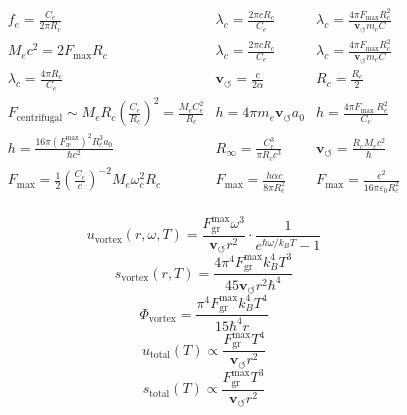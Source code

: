     \begin{equation*}
    \begin{array}{ccc}
            f_e = \frac{C_e}{2 \pi R_c} & \lambda_c = \frac{2 \pi c R_c}{C_e} & \lambda_c = \frac{4 \pi F_{\max } R_c^2}{\mathbf{v}_{\scriptscriptstyle\boldsymbol{\circlearrowleft}} m_e C} \\
            M_e c^2 = 2 F_{\max } R_c & \lambda_c = \frac{2 \pi c R_c}{C_e} & \lambda_c = \frac{4 \pi F_{\max } R_c^2}{\mathbf{v}_{\scriptscriptstyle\boldsymbol{\circlearrowleft}} m_e C} \\
            \lambda_c = \frac{4 \pi R_c}{C_e} & \mathbf{v}_{\scriptscriptstyle\boldsymbol{\circlearrowleft}} = \frac{c}{2 \alpha} & R_c = \frac{R_e}{2} \\
            F_\text{centrifugal} \sim M_e R_c \left(\frac{C_e}{R_c}\right)^2 = \frac{M_e C_e^2}{R_c} & h = 4 \pi m_e \mathbf{v}_{\scriptscriptstyle\boldsymbol{\circlearrowleft}} a_0 & h = \frac{4 \pi F_\text {max } R_e^2}{C_e} \\
            h = \frac{16 \pi (F^{\text{max}}_{\text{\ae}})^2 R_c^3 a_0}{\hbar c^2} & R_\infty = \frac{C_e^3}{\pi R_c c^3} & \mathbf{v}_{\scriptscriptstyle\boldsymbol{\circlearrowleft}} = \frac{R_c M_e c^2}{\hbar} \\
            F_{\max} = \frac{1}{2} \left( \frac{C_e}{c} \right)^{-2} M_e \omega_c^2 R_c & F_{\max} = \frac{h \alpha c}{8 \pi R_c^2} & F_{\max} = \frac{e^2}{16 \pi \varepsilon_0 R_c^2} \\
    \end{array}
    \end{equation*}


\begin{equation*}
    u_\text{vortex}(r, \omega, T) = \frac{F^{\text{max}}_{\text{gr}} \omega^3}{\mathbf{v}_{\scriptscriptstyle\boldsymbol{\circlearrowleft}} r^2} \cdot \frac{1}{e^{\hbar \omega / k_B T} - 1}
\end{equation*}
\begin{equation*}
    s_\text{vortex}(r, T) = \frac{4 \pi^4 F^{\text{max}}_{\text{gr}} k_B^4 T^3}{45 \mathbf{v}_{\scriptscriptstyle\boldsymbol{\circlearrowleft}} r^2 \hbar^4}
\end{equation*}
\begin{equation*}
    \Phi_\text{vortex} = \frac{\pi^4 F^{\text{max}}_{\text{gr}} k_B^4 T^4}{15 \hbar^4 r}
\end{equation*}
\begin{equation*}
    u_\text{total}(T) \propto \frac{F^{\text{max}}_{\text{gr}} T^4}{\mathbf{v}_{\scriptscriptstyle\boldsymbol{\circlearrowleft}} r^2}
\end{equation*}
\begin{equation*}
    s_\text{total}(T) \propto \frac{F^{\text{max}}_{\text{gr}} T^3}{\mathbf{v}_{\scriptscriptstyle\boldsymbol{\circlearrowleft}} r^2}
\end{equation*}




